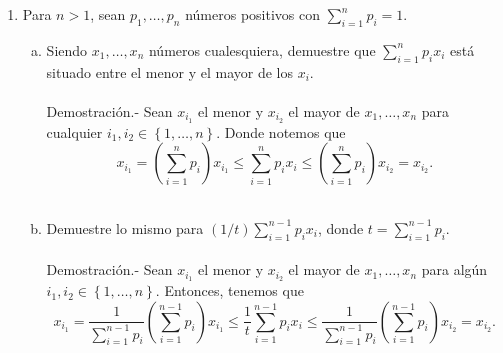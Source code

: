 \begin{enumerate}[\bfseries 1.]
\begin{enumerate}[(a)]
	\end{enumerate}

    \item Para $n>1$, sean $p_1, \ldots , p_n$ números positivos con $\displaystyle\sum_{i=1}^n p_i=1$.

	\begin{enumerate}[(a)]

	    \item Siendo $x_1,\ldots,x_n$ números cualesquiera, demuestre que $\displaystyle\sum_{i=1}^n p_ix_i$ está situado entre el menor y el mayor de los $x_i$.\\\\
		Demostración.-\; Sean $x_{i_1}$ el menor y $x_{i_2}$ el mayor de $x_1,\ldots,x_n$ para cualquier $i_1,i_2\in \left\{1,\ldots,n\right\}$. Donde notemos que
		$$x_{i_1}=\left(\sum_{i=1}^n p_i\right)x_{i_1}\leq \sum_{i=1}^n p_ix_i \leq \left(\sum_{i=1}^n p_i\right)x_{i_2}=x_{i_2}.$$\\

	    \item Demuestre lo mismo para $( 1/t) \displaystyle\sum_{i=1}^{n-1}p_ix_i$, donde $t = \displaystyle\sum_{i=1}^{n-1}p_i$.\\\\
		Demostración.-\; Sean $x_{i_1}$ el menor y $x_{i_2}$ el mayor de $x_1,\ldots,x_n$ para algún $i_1,i_2\in \left\{1,\ldots,n\right\}$. Entonces, tenemos que
		$$x_{i_1}=\dfrac{1}{\displaystyle\sum_{i=1}^{n-1}p_i}\left(\sum_{i=1}^{n-1}p_i\right)x_{i_1}\leq \dfrac{1}{t}\sum_{i=1}^{n-1}p_ix_i \leq \dfrac{1}{\displaystyle\sum_{i=1}^{n-1}p_i}\left(\sum_{i=1}^{n-1}p_i\right)x_{i_2}=x_{i_2}.$$\\
 

\end{enumerate}
\end{enumerate}
